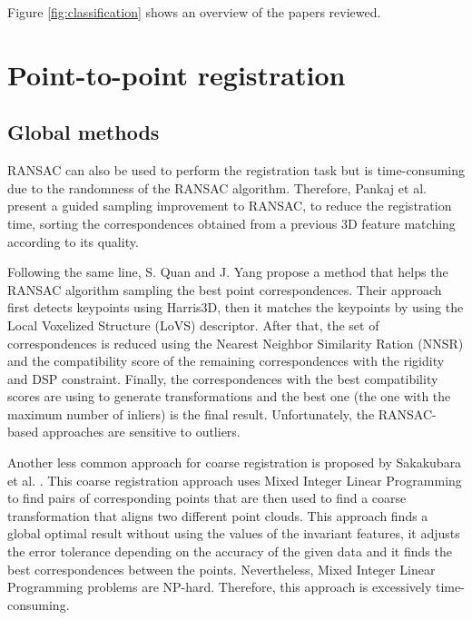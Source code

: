     Figure \ref{fig:classification} shows an overview of the papers reviewed.

    \section{Point-to-point registration}
        \subsection{Global methods}

        RANSAC \cite{Fischler_1981_RANSAC} can also be used to perform the registration task but is time-consuming due to the randomness
        of the RANSAC algorithm. Therefore, Pankaj et al. \cite{Pankaj_2015_arobust} present a guided sampling improvement to RANSAC,
        to reduce the registration time, sorting the correspondences obtained from a previous 3D feature matching according to its quality.
        
        Following the same line, S. Quan and J. Yang \cite{Quan_2020_com} propose a method that helps the RANSAC algorithm 
        sampling the best point correspondences. Their approach first detects keypoints using Harris3D, then it matches the keypoints
        by using the Local Voxelized Structure (LoVS) descriptor. After that, the set of correspondences is reduced using the 
        Nearest Neighbor Similarity Ration (NNSR) and the compatibility score of the remaining correspondences with the rigidity and 
        DSP constraint. Finally, the correspondences with the best compatibility scores are using to generate transformations and 
        the best one (the one with the maximum number of inliers) is the final result. Unfortunately, the RANSAC-based approaches are sensitive to outliers.

        Another less common approach for coarse registration is proposed by Sakakubara et al. \cite{Sakakubara_2007_automatic}.
        This coarse registration approach uses Mixed Integer Linear Programming to find pairs of corresponding points that are then 
        used to find a coarse transformation that aligns two different point clouds.
        This approach finds a global optimal result without using the values of the invariant features, 
        it adjusts the error tolerance depending on the accuracy of the given data and 
        it finds the best correspondences between the points.
        Nevertheless, Mixed Integer Linear Programming problems are NP-hard. Therefore, this approach is excessively time-consuming.

